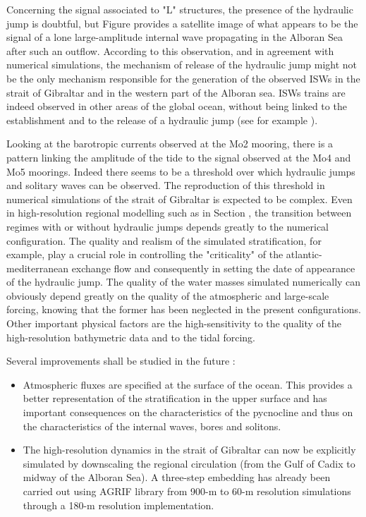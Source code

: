 Concerning the signal associated to "L" structures, the presence of the hydraulic jump is doubtful, but Figure  provides a satellite image of what appears to be the signal of a lone large-amplitude internal wave propagating in the Alboran Sea after such an outflow. According to this observation, and in agreement with numerical simulations, the mechanism of release of the hydraulic jump might not be the only mechanism responsible for the generation of the observed ISWs in the strait of Gibraltar and in the western part of the Alboran sea. ISWs trains are indeed observed in other areas of the global ocean, without being linked to the establishment and to the release of a hydraulic jump (see for example \citet{chen_2017}).

Looking at the barotropic currents observed at the Mo2 mooring, there is a pattern linking the amplitude of the tide to the signal observed at the Mo4 and Mo5 moorings. Indeed there seems to be a threshold over which hydraulic jumps and solitary waves can be observed. The reproduction of this threshold in numerical simulations of the strait of Gibraltar is expected to be complex. Even in high-resolution regional modelling such as in Section , the transition between regimes with or without hydraulic jumps depends greatly to the numerical configuration. The quality and realism of the simulated stratification, for example, play a crucial role in controlling the "criticality" of the atlantic-mediterranean exchange flow and consequently in setting the date of appearance of the hydraulic jump. The quality of the water masses simulated numerically can obviously depend greatly on the quality of the atmospheric and large-scale forcing, knowing that the former has been neglected in the present configurations. Other important physical factors are the high-sensitivity to the quality of the high-resolution bathymetric data and to the tidal forcing.

Several improvements shall be studied in the future : 
\begin{itemize}
\item Atmospheric fluxes are specified at the surface of the ocean.  This provides a better representation of the stratification in the upper surface and has important consequences on the characteristics of the pycnocline and thus on the characteristics of the internal waves, bores and solitons.
\item The high-resolution dynamics in the strait of Gibraltar can now be explicitly simulated by downscaling the regional circulation (from the Gulf of Cadix to midway of the Alboran Sea). A three-step embedding has already been carried out using AGRIF library from 900-m to 60-m resolution simulations through a 180-m resolution implementation.
\end{itemize}
 

